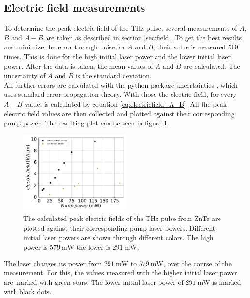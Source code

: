 \subsection{Electric field measurements}
\label{sec:znte_electricfield}
To determine the peak electric field of the $\si{\tera\hertz}$ pulse, several measurements of $A$, $B$ and $A-B$ are taken as described in section \ref{sec:field}.
To get the best results and minimize the error through noise for $A$ and $B$, their value is measured $500$ times.
This is done for the high initial laser power and the lower initial laser power.
After the data is taken, the mean values of $A$ and $B$ are calculated.
The uncertainty of $A$ and $B$ is the standard deviation.
\\
All further errors are calculated with the python package uncertainties \cite{uncertainties}, which uses standard error propagation theory.
With those the electric field, for every $A-B$ value, is calculated by equation \eqref{eq:electricfield_A_B}.
All the peak electric field values are then collected and plotted against their corresponding pump power.
The resulting plot can be seen in figure \ref{fig:znte_electricfield}.
\\
\begin{figure}
    \centering
    \includegraphics[width=0.5\textwidth]{Plots/eltric_field_ZnTe.pdf}
    \caption{The calculated peak electric fields of the $\si{\tera\hertz}$ pulse from ZnTe are plotted against their corresponding pump laser powers.
    Different initial laser powers are shown through different colors. The high power is $\SI{579}{\milli\W}$ the lower is $\SI{291}{\milli\W}$.}
    \label{fig:znte_electricfield}
\end{figure}
The laser changes its power from $\SI{291}{\milli\W}$ to $\SI{579}{\milli\W}$, over the course of the measurement. 
For this, the values measured with the higher initial laser power are marked with green stars.
The lower initial laser power of $\SI{291}{\milli\W}$ is marked with black dots.
